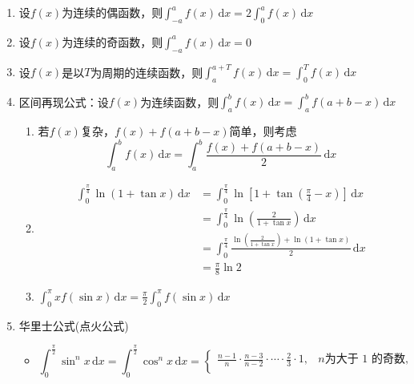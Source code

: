 \documentclass[a4paper,12pt]{article}
\begin{document}
    \begin{enumerate}
        \item 设$f(x)$为连续的偶函数，则$\int_{-a}^{a} f(x)\,\mathrm{d}x = 2\int_{0}^{a} f(x)\,\mathrm{d}x$
        \item 设$f(x)$为连续的奇函数，则$\int_{-a}^{a} f(x)\,\mathrm{d}x = 0$
        \item 设$f(x)$是以$T$为周期的连续函数，则$\int_{a}^{a + T} f(x)\,\mathrm{d}x = \int_{0}^{T} f(x)\,\mathrm{d}x$
        \item 区间再现公式：设$f(x)$为连续函数，则$\int_{a}^{b} f(x)\,\mathrm{d}x = \int_{a}^{b} f(a + b - x)\,\mathrm{d}x$
        \begin{enumerate}
            \item 若$f(x)$复杂，$f(x) + f(a + b - x)$简单，则考虑
            \[
                \int_a^b f(x)\,\mathrm{d}x = \int_a^b \frac{f(x) + f(a + b - x)}{2}\,\mathrm{d}x
            \]
            \item {}
            \[
                \begin{aligned}
                    \int_0^{\frac{\pi}{4}} \ln(1+\tan x)\,\mathrm{d}x
                    &= \int_0^{\frac{\pi}{4}}
                    \ln\!\left[1+\tan\!\left(\frac{\pi}{4}-x\right)\right]
                    \,\mathrm{d}x \\[6pt]
                    &= \int_0^{\frac{\pi}{4}}
                    \ln\!\left(\frac{2}{1+\tan x}\right)
                    \,\mathrm{d}x \\[6pt]
                    &= \int_0^{\frac{\pi}{4}}
                    \frac{
                        \ln\!\left(\frac{2}{1+\tan x}\right)
                        +
                        \ln(1+\tan x)
                    }{2}
                    \,\mathrm{d}x \\[8pt]
                    &= \frac{\pi}{8}\ln 2
                \end{aligned}
            \]
            \item $\displaystyle\int_0^{\pi} xf(\sin x)\,\mathrm{d}x = \frac{\pi}{2}\int_0^{\pi} f(\sin x)\,\mathrm{d}x$
        \end{enumerate}
        \item 华里士公式(点火公式)
        \begin{itemize}
            \item \[
                      \int_{0}^{\frac{\pi}{2}} \sin^{n} x \,\mathrm{d}x
                      =
                      \int_{0}^{\frac{\pi}{2}} \cos^{n} x \,\mathrm{d}x
                      =
                      \begin{cases}
                          \displaystyle
                          \frac{n-1}{n}
                          \cdot
                          \frac{n-3}{n-2}
                          \cdot
                          \cdots
                          \cdot
                          \frac{2}{3}
                          \cdot
                          1,
                          & n \text{为大于 1 的奇数}, \\[1.2em]


\end{cases}\]
\end{itemize}
\end{enumerate}
\end{document}
